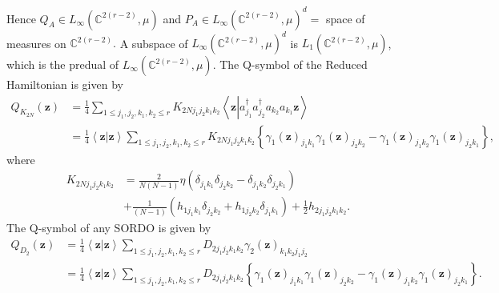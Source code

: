 \documentclass[aps,preprint]{revtex4}%
\begin{document}
Hence $Q_{A}\mathbf{\in}L_{\infty}\left(  \mathbb{C}^{2\left(  r-2\right)
},\mu\right)  $ and $P_{A}\mathbf{\in}L_{\infty}\left(  \mathbb{C}^{2\left(
r-2\right)  },\mu\right)  ^{d}=$ space of measures on $\mathbb{C}^{2\left(
r-2\right)  }.$ A subspace of $L_{\infty}\left(  \mathbb{C}^{2\left(
r-2\right)  },\mu\right)  ^{d}$ is $L_{1}\left(  \mathbb{C}^{2\left(
r-2\right)  },\mu\right)  $, which is the predual of $L_{\infty}\left(
\mathbb{C}^{2\left(  r-2\right)  },\mu\right)  .$ The Q-symbol of the Reduced
Hamiltonian is given by
\begin{align}
Q_{K_{2N}}\left(  \mathbf{z}\right)   &  =\frac{1}{4}\sum_{1\leq j_{1}%
,j_{2},k_{1},k_{2}\leq r}K_{2Nj_{1}j_{2}k_{1}k_{2}}\left\langle \mathbf{z}%
\left\vert a_{j_{1}}^{\dagger}a_{j_{2}}^{\dagger}a_{k_{2}}a_{k_{1}}%
\mathbf{z}\right.  \right\rangle \nonumber\\
&  =\frac{1}{4}\left\langle \mathbf{z}\left\vert \mathbf{z}\right.
\right\rangle \sum_{1\leq j_{1},j_{2},k_{1},k_{2}\leq r}K_{2Nj_{1}j_{2}%
k_{1}k_{2}}\left\{  \gamma_{1}\left(  \mathbf{z}\right)  _{j_{1}k_{1}}%
\gamma_{1}\left(  \mathbf{z}\right)  _{j_{2}k_{2}}-\gamma_{1}\left(
\mathbf{z}\right)  _{j_{1}k_{2}}\gamma_{1}\left(  \mathbf{z}\right)
_{j_{2}k_{1}}\right\}  ,
\end{align}
where%
\begin{align}
K_{2Nj_{1}j_{2}k_{1}k_{2}}  &  =\frac{2}{N\left(  N-1\right)  }\eta\left(
\delta_{j_{1}k_{1}}\delta_{j_{2}k_{2}}-\delta_{j_{1}k_{2}}\delta_{j_{2}k_{1}%
}\right) \nonumber\\
&  +\frac{1}{\left(  N-1\right)  }\left(  h_{1j_{1}k_{1}}\delta_{j_{2}k_{2}%
}+h_{1j_{2}k_{2}}\delta_{j_{1}k_{1}}\right)  +\frac{1}{2}h_{2j_{1}j_{2}%
k_{1}k_{2}}.
\end{align}
The Q-symbol of any SORDO is given by
\begin{align}
Q_{D_{2}}\left(  \mathbf{z}\right)   &  =\frac{1}{4}\left\langle
\mathbf{z}\left\vert \mathbf{z}\right.  \right\rangle \sum_{1\leq j_{1}%
,j_{2},k_{1},k_{2}\leq r}D_{2j_{1}j_{2}k_{1}k_{2}}\gamma_{2}\left(
\mathbf{z}\right)  _{k_{1}k_{2}j_{1}j_{2}}\nonumber\\
&  =\frac{1}{4}\left\langle \mathbf{z}\left\vert \mathbf{z}\right.
\right\rangle \sum_{1\leq j_{1},j_{2},k_{1},k_{2}\leq r}D_{2j_{1}j_{2}%
k_{1}k_{2}}\left\{  \gamma_{1}\left(  \mathbf{z}\right)  _{j_{1}k_{1}}%
\gamma_{1}\left(  \mathbf{z}\right)  _{j_{2}k_{2}}-\gamma_{1}\left(
\mathbf{z}\right)  _{j_{1}k_{2}}\gamma_{1}\left(  \mathbf{z}\right)
_{j_{2}k_{1}}\right\}  .
\end{align}
\end{document}
